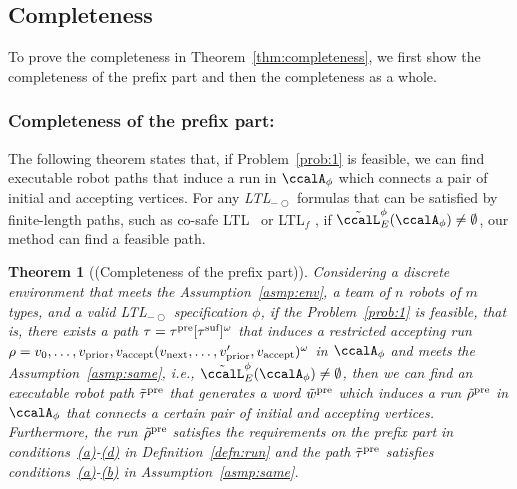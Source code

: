 \documentclass[Afour,sageh,times]{sagej}
\newtheorem{thm}{Theorem}[section]
\newcommand{\ltl}{ {\it LTL}$_{-\bigcirc}$ }
\newcommand{\auto}[1]{\ccalA_{\textup{#1}}}
\newcommand{\autop}{\ccalA_{\phi}}
\newcommand{\vertex}[1]{v_{\textup{#1}}}
\begin{document}
{{\subsection{Completeness}\label{app:completeness}
To prove the completeness in Theorem~\ref{thm:completeness}, we first show the completeness of the prefix part and then the completeness as a whole.
\subsubsection{Completeness of the prefix part:}
The following theorem states that, if Problem~\ref{prob:1} is feasible, we can find executable robot paths that induce a run in $\autop$ which connects a pair of initial and accepting vertices.  For any \ltl formulas that can be satisfied by finite-length paths, such as co-safe LTL~\citep{kupferman2001model} or LTL$_f$ \citep{de2013linear}, if $\tilde{\ccalL}_E^\phi(\autop) \neq \emptyset$, our method can find a feasible path.
\begin{thm}[(Completeness of the prefix part)]\label{thm:prefix}
  Considering  a discrete environment that meets the Assumption~\ref{asmp:env}, a team of $n$ robots of $m$ types, and a valid \ltl specification $\phi$, if the Problem~\ref{prob:1} is feasible, that is, there exists a path $\tau = \tau^\textup{pre} [\tau^\textup{suf}]^\omega$ that induces a restricted accepting run $\rho = v_0, \ldots, \vertex{prior}, \vertex{accept} (\vertex{next}, \ldots, \vertex{prior}', \vertex{accept})^\omega$ in $\autop$ and meets the Assumption~\ref{asmp:same}, i.e.,  $\tilde{\ccalL}_E^\phi(\autop) \neq \emptyset$, then we can find an executable robot path $\tilde{\tau}^{\textup{pre}}$ that generates a word $\tilde{w}^{\textup{pre}}$ which induces a run $\tilde{\rho}^{\textup{pre}}$ in $\autop$ that connects a certain pair of initial and accepting vertices. Furthermore, the run $\tilde{\rho}^{\textup{pre}}$ satisfies the requirements on the prefix part in conditions~\hyperref[cond:a]{\it (a)}-\hyperref[cond:e]{\it (d)} in Definition~\ref{defn:run} and the path $\tilde{\tau}^{\textup{pre}}$ satisfies conditions~\hyperref[asmp:a]{\it (a)}-\hyperref[asmp:b]{\it (b)} in Assumption~\ref{asmp:same}. %

\end{thm}}}
\end{document}
